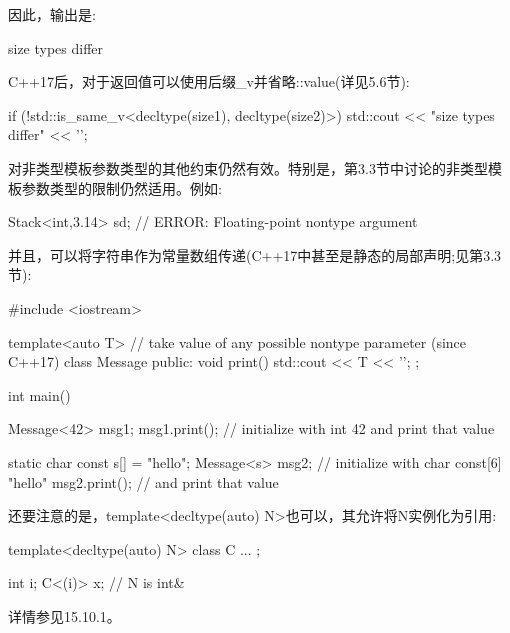 因此，输出是:

\begin{shell}
size types differ
\end{shell}

C++17后，对于返回值可以使用后缀\_v并省略::value(详见5.6节):

\begin{cpp}
if (!std::is_same_v<decltype(size1), decltype(size2)>) {
	std::cout << "size types differ" << '\n';
}
\end{cpp}

对非类型模板参数类型的其他约束仍然有效。特别是，第3.3节中讨论的非类型模板参数类型的限制仍然适用。例如:

\begin{cpp}
Stack<int,3.14> sd; // ERROR: Floating-point nontype argument
\end{cpp}

并且，可以将字符串作为常量数组传递(C++17中甚至是静态的局部声明;见第3.3节):

\begin{cpp}
#include <iostream>

template<auto T> // take value of any possible nontype parameter (since C++17)
class Message {
	public:
	void print() {
		std::cout << T << '\n';
	}
};

int main()
{
	Message<42> msg1;
	msg1.print(); // initialize with int 42 and print that value
	
	static char const s[] = "hello";
	Message<s> msg2; // initialize with char const[6] "hello"
	msg2.print(); // and print that value
}
\end{cpp}

还要注意的是，template<decltype(auto) N>也可以，其允许将N实例化为引用:

\begin{cpp}
template<decltype(auto) N>
class C {
	...
};

int i;
C<(i)> x; // N is int&
\end{cpp}

详情参见15.10.1。




